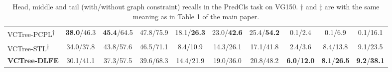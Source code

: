 \documentclass[sigconf]{acmart}
\begin{document}
\begin{table*}[htbp]
{\begin{tabular}{l|c c c|c c c|c c c}
VCTree-PCPL\textsuperscript{$\dagger$} \cite{yan2020pcpl} & \textbf{38.0}/46.3 & \textbf{45.4}/64.5 & 47.8/75.9 & 18.1/\textbf{26.3} & 23.0/\textbf{42.6} & 25.4/\textbf{54.2} & 0.1/2.4 & 0.1/6.9 & 0.1/16.1 \\
VCTree-STL\textsuperscript{$\dagger$} \cite{chen2019soft} & 34.0/37.8 & 43.8/57.6 & 46.5/71.1 & 8.4/10.9 & 14.3/26.1 & 17.1/41.8 & 2.4/3.6 & 8.4/13.8 & 9.1/23.5 \\
\textbf{VCTree-DLFE} & 30.1/41.1 & 37.3/57.5 & 39.6/68.3 & 14.4/21.9 & 19.0/36.0 & 20.8/48.2 & \textbf{6.0}/\textbf{12.0} & \textbf{8.1}/\textbf{26.5} & \textbf{9.2}/\textbf{38.1} \\
\hline
\end{tabular}
}
\vspace{0.1em}
\caption{Head, middle and tail (with/without graph constraint) recalls in the PredCls task on VG150. $\dagger$ and $\ddagger$ are with the same meaning as in Table 1 of the main paper.
}
\label{tab:head_mid_tail_predcls}
\vspace{1em}
\end{table*}
\end{document}
